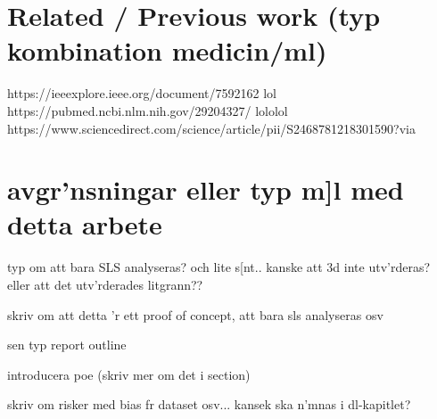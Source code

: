

\section{Related / Previous work (typ kombination medicin/ml)}
https://ieeexplore.ieee.org/document/7592162 lol
https://pubmed.ncbi.nlm.nih.gov/29204327/ lololol
https://www.sciencedirect.com/science/article/pii/S2468781218301590?via%

\section{avgr'nsningar eller typ m]l med detta arbete}
typ om att bara SLS analyseras? och lite s[nt.. kanske att 3d inte utv'rderas? eller att det utv'rderades litgrann??

skriv om att detta 'r ett proof of concept, att bara sls analyseras osv

sen typ report outline


introducera poe  (skriv mer om det i section)

skriv om risker med bias fr dataset osv... kansek ska n'mnas i dl-kapitlet?


